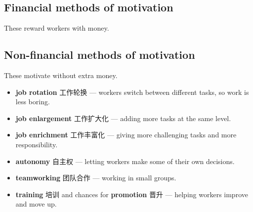 \documentclass[11pt]{article}
\begin{document}
\subsection*{Financial methods of motivation}

These reward workers with money.

\begin{center}
\end{center}

\subsection*{Non-financial methods of motivation}

These motivate without extra money.

\begin{itemize}
\item \textbf{job rotation} 工作轮换 — workers switch between different tasks, so work is less boring.

\item \textbf{job enlargement} 工作扩大化 — adding more tasks at the same level.

\item \textbf{job enrichment} 工作丰富化 — giving more challenging tasks and more responsibility.

\item \textbf{autonomy} 自主权 — letting workers make some of their own decisions.

\item \textbf{teamworking} 团队合作 — working in small groups.

\item \textbf{training} 培训 and chances for \textbf{promotion} 晋升 — helping workers improve and move up.

\end{itemize}
\end{document}
